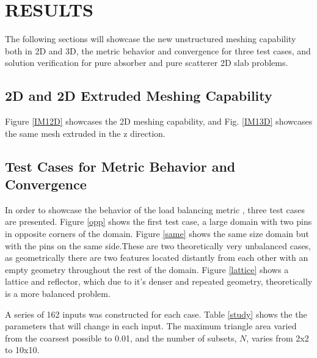 \pagestyle{plain} %
\setcounter{page}{1}

\chapter{\uppercase {Results}}


The following sections will showcase the new unstructured meshing capability both in 2D and 3D, the metric behavior and convergence for three test cases, and solution verification for pure absorber and pure scatterer 2D slab problems. 

\section{2D and 2D Extruded Meshing Capability}



Figure \ref{IM12D} showcases the 2D meshing capability, and Fig. \ref{IM13D} showcases the same mesh extruded in the z  direction.



\section{Test Cases for Metric Behavior and Convergence}

In order to showcase the behavior of the load balancing metric , three test cases are presented. Figure \ref{opp} shows the first test case, a large domain with two pins in opposite corners of the domain. Figure \ref{same} shows the same size domain but with the pins on the same side.These are two theoretically very unbalanced cases, as geometrically there are two features located distantly from each other with an empty geometry throughout the rest of the domain. Figure \ref{lattice} shows a lattice and reflector, which due to it's denser and repeated geometry, theoretically is a more balanced problem. 

A series of 162 inputs was constructed for each case. Table \ref{study} shows the the parameters that will change in each input. The maximum triangle area varied from the coarsest possible to 0.01, and the number of subsets, $N$, varies from 2x2 to 10x10. 

